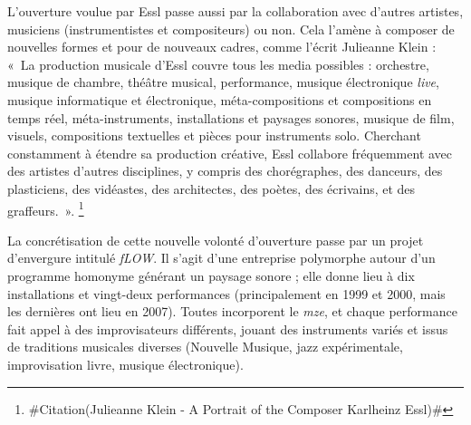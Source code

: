 \documentclass[a4paper,12pt]{article}
\newcommand{\guill}[1]{«~#1~»}
\newcommand{\zitat}[2]{\#Citation(#2)\#}
\newcommand{\maze}[0]{\emph{m\symbol{64}ze\textdegree2}}
\begin{document}
L'ouverture voulue par Essl passe aussi par la collaboration avec d'autres artistes, musiciens (instrumentistes et compositeurs) ou non. Cela l'amène à composer de nouvelles formes et pour de nouveaux cadres, comme l'écrit Julieanne Klein : \guill{La production musicale d'Essl couvre tous les media possibles : orchestre, musique de chambre, théâtre musical, performance, musique électronique \emph{live}, musique informatique et électronique, méta-compositions et compositions en temps réel, méta-instruments, installations et paysages sonores, musique de film, visuels, compositions textuelles et pièces pour instruments solo. Cherchant constamment à étendre sa production créative, Essl collabore fréquemment avec des artistes d'autres disciplines, y compris des chorégraphes, des danceurs, des plasticiens, des vidéastes, des architectes, des poètes, des écrivains, et des graffeurs.}.
\footnote{\zitat{Essl's compositional output spans every possible medium: orchestral, chamber, musical theater/performance, live electronics, electronic computer music, real-time and meta compositions, meta-instruments, installations and soundscapes, film music, visuals, text compositions and works for solo instruments. Always looking to expand his creative output, Essl frequently collaborates with artists from other fields, including choreographers, dancers, visual artists, video artists, architects, poets, authors, and graffiti artists.}
{Julieanne Klein - A Portrait of the Composer Karlheinz Essl}	}

La concrétisation de cette nouvelle volonté d'ouverture passe par un projet d'envergure intitulé \emph{fLOW}. Il s'agit d'une entreprise polymorphe autour d'un programme homonyme générant un paysage sonore ; elle donne lieu à dix installations et vingt-deux performances (principalement en 1999 et 2000, mais les dernières ont lieu en 2007). Toutes incorporent le \maze, et chaque performance fait appel à des improvisateurs différents, jouant des instruments variés et issus de traditions musicales diverses (Nouvelle Musique, jazz expérimentale, improvisation livre, musique électronique).
\end{document}

